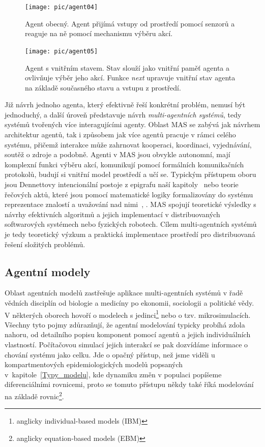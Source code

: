 \begin{figure}%
\centerline{%
\texttt{[image: pic/agent04]}%
}
\caption{Agent obecný. Agent přijímá vstupy od prostředí pomocí senzorů a reaguje na ně pomocí mechanismu výběru akcí.}%
\label{fig:agent}%
\end{figure}

\begin{figure}%
\centerline{%
\texttt{[image: pic/agent05]}%
}
\caption{Agent s vnitřním stavem. Stav slouží jako vnitřní paměť agenta a ovlivňuje výběr jeho akcí. Funkce \emph{next} upravuje vnitřní stav agenta na základě současného stavu a vstupu z prostředí.}%
\label{fig:agent-stav}%
\end{figure}

Již návrh jednoho agenta, který efektivně řeší konkrétní problém, nemusí být jednoduchý, a další úroveň představuje návrh \emph{multi-agentních systémů}, tedy systémů tvořených více interagujícími agenty.  
Oblast MAS se zabývá jak návrhem architektur agentů, tak i způsobem jak více agentů pracuje v rámci celého systému, přičemž interakce může zahrnovat kooperaci, koordinaci, vyjednávání, soutěž o zdroje a podobně. Agenti v MAS jsou obvykle autonomní, mají komplexní funkci výběru akcí, komunikují pomocí formálních komunikačních protokolů, budují si vnitřní model prostředí a učí se. Typickým přístupem oboru jsou Dennettovy intencionální postoje z epigrafu naší kapitoly~\cite{Dennett87} nebo teorie řečových aktů, které jsou pomocí matematické logiky formalizovány do systému reprezentace znalostí a uvažování nad nimi~\cite{Shoham93}, \cite{Cohen96}. MAS spojují teoretické výsledky s návrhy efektivních algoritmů a jejich implementací v distribuovaných softwarových systémech nebo fyzických robotech. Cílem multi-agentních systémů je tedy teoretický výzkum a praktická implementace prostředí pro distribuovaná řešení složitých problémů.  

\subsection*{Agentní modely}

Oblast agentních modelů zastřešuje aplikace multi-agentních systémů v řadě vědních disciplín od biologie a medicíny po ekonomii, sociologii a politické vědy. V některých oborech hovoří o modelech s jedinci\footnote{anglicky individual-based models (IBM)} nebo o tzv. mikrosimulacích. 
Všechny tyto pojmy zdůrazňují, že agentní modelování typicky probíhá zdola nahoru, od detailního popisu komponent pomocí agentů a jejich individuálních vlastností.  Počítačovou simulací jejich interakcí se pak dozvídáme informace o chování systému jako celku. Jde o opačný přístup, než jsme viděli u kompartmentových epidemiologických modelů popsaných v~kapitole~\ref{Typy_modelu}, kde dynamiku změn v populaci popíšeme diferenciálními rovnicemi, proto se tomuto přístupu někdy  také říká modelování na základě rovnic\footnote{anglicky equation-based models (EBM)}. 

